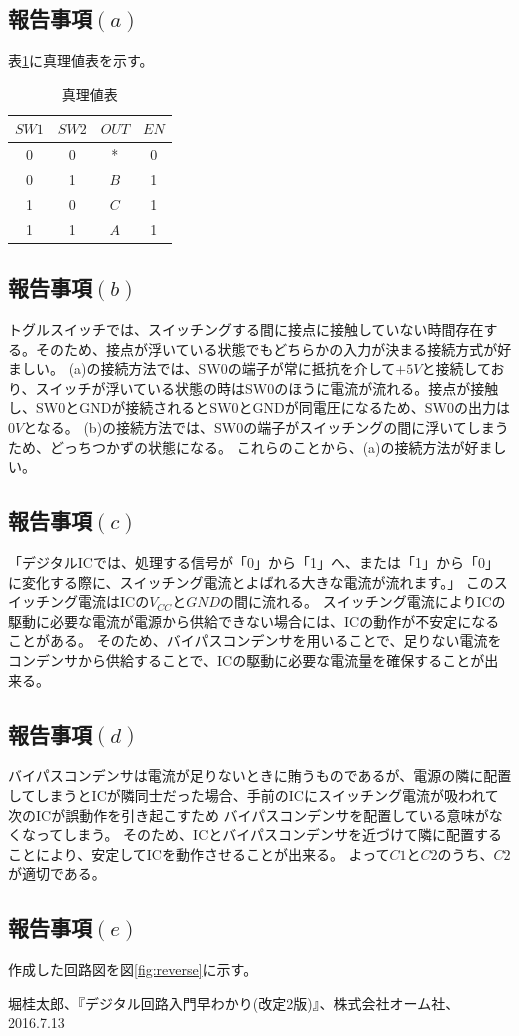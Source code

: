 \documentclass[a4paper,11pt]{ltjsarticle}
\begin{document}
\subsection{報告事項$(a)$}
表\ref{tab:a}に真理値表を示す。
\begin{table}[htbp]
  \centering
  \caption{真理値表}
  \begin{tabular}{|cc|cc|}
    \hline
    $SW1$  & $SW2$  &  $OUT$ & $EN$\\
    \hline
    0 & 0 &* & 0 \\
    0 & 1 &$B$ &1 \\
    1 & 0 &$C$ &1 \\
    1 & 1 &$A$ &1 \\
    \hline
  \end{tabular}
  \label{tab:a}
\end{table}
\subsection{報告事項$(b)$}
トグルスイッチでは、スイッチングする間に接点に接触していない時間存在する。そのため、接点が浮いている状態でもどちらかの入力が決まる接続方式が好ましい。
(a)の接続方法では、SW0の端子が常に抵抗を介して$+5V$と接続しており、スイッチが浮いている状態の時はSW0のほうに電流が流れる。接点が接触し、SW0とGNDが接続されるとSW0とGNDが同電圧になるため、SW0の出力は$0V$となる。
(b)の接続方法では、SW0の端子がスイッチングの間に浮いてしまうため、どっちつかずの状態になる。
これらのことから、(a)の接続方法が好ましい。
\subsection{報告事項$(c)$}
「デジタルICでは、処理する信号が「0」から「1」へ、または「1」から「0」に変化する際に、スイッチング電流とよばれる大きな電流が流れます。」\cite{参照ラベル名1}
このスイッチング電流はICの$V_{CC}$と$GND$の間に流れる。
スイッチング電流によりICの駆動に必要な電流が電源から供給できない場合には、ICの動作が不安定になることがある。
そのため、バイパスコンデンサを用いることで、足りない電流をコンデンサから供給することで、ICの駆動に必要な電流量を確保することが出来る。
\subsection{報告事項$(d)$}
バイパスコンデンサは電流が足りないときに賄うものであるが、電源の隣に配置してしまうとICが隣同士だった場合、手前のICにスイッチング電流が吸われて次のICが誤動作を引き起こすため
バイパスコンデンサを配置している意味がなくなってしまう。
そのため、ICとバイパスコンデンサを近づけて隣に配置することにより、安定してICを動作させることが出来る。
よって$C1$と$C2$のうち、$C2$が適切である。
\subsection{報告事項$(e)$}
作成した回路図を図\ref{fig:reverse}に示す。



\begin{thebibliography}{9}
   堀桂太郎、『デジタル回路入門早わかり(改定2版)』、株式会社オーム社、2016.7.13
\end{thebibliography}
\end{document}
